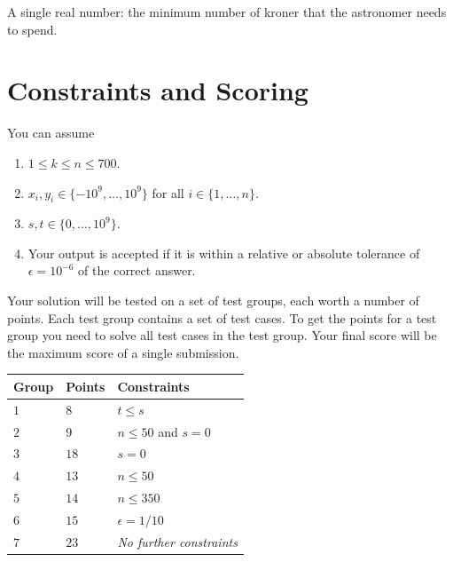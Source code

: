 A single real number: the minimum number of kroner that the astronomer needs to spend.

\section*{Constraints and Scoring}

You can assume 
\begin{enumerate}
\item $1\leq k\leq n\leq 700$. %
\item $x_i, y_i\in \{-10^9,\ldots, 10^9\}$ for all $i\in\{1,\ldots,n\}$. %
\item $s,t\in \{0,\ldots, 10^9\}$. %
\item Your output is accepted if it is within a relative or absolute tolerance of $\epsilon = 10^{-6}$ of the correct answer.
\end{enumerate}


Your solution will be tested on a set of test groups, each worth a number of points.
Each test group contains a set of test cases.
To get the points for a test group you need to solve all test cases in the test group.
Your final score will be the maximum score of a single submission.

\medskip
\noindent
\begin{tabular}{lll}
  Group & Points & Constraints\\\hline
  $1$ & $8$ &  $t\leq s$\\
  $2$ & $9$ & $n\le 50$ and $s=0$\\
  $3$ & $18$ & $s=0$\\
  $4$ & $13$ & $n\leq 50$\\
  $5$ & $14$ & $n\leq 350$\\
  $6$ & $15$ & $\epsilon = 1/10$\\
  $7$ & $23$ & \emph{No further constraints}\\
\end{tabular}
